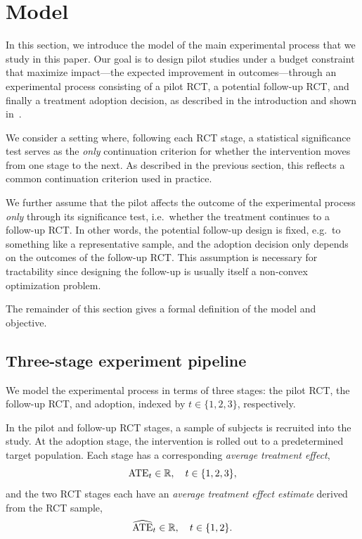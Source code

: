 \section{Model}
\label{sec:Model}

In this section, we introduce the model of the main experimental process that we study in this paper.
Our goal is to design pilot studies under a budget constraint that maximize impact---the expected improvement in outcomes---through an experimental process consisting of a pilot RCT, a potential follow-up RCT, and finally a treatment adoption decision, as described in the introduction and shown in~.

We consider a setting where, following each RCT stage, a statistical significance test serves as the \emph{only} continuation criterion for whether the intervention moves from one stage to the next.
As described in the previous section, this reflects a common continuation criterion used in practice.

We further assume that the pilot affects the outcome of the experimental process \emph{only} through its significance test, i.e.\ whether the treatment continues to a follow-up RCT.
In other words, the potential follow-up design is fixed, e.g.\ to something like a representative sample, and the adoption decision only depends on the outcomes of the follow-up RCT.
This assumption is necessary for tractability since designing the follow-up is usually itself a non-convex optimization problem.

The remainder of this section gives a formal definition of the model and objective.

\subsection{Three-stage experiment pipeline}

We model the experimental process in terms of three stages: the pilot RCT, the follow-up RCT, and adoption, indexed by $t\in\{1,2,3\}$, respectively.

In the pilot and follow-up RCT stages, a sample of subjects is recruited into the study.
At the adoption stage, the intervention is rolled out to a predetermined target population.
Each stage has a corresponding \emph{average treatment effect},
\[
  \mathrm{ATE}_t\in\mathbb{R},\quad t\in\{1,2,3\},
\]
and the two RCT stages each have an \emph{average treatment effect estimate} derived from the RCT sample,
\[
  \widehat{\mathrm{ATE}}_t\in\mathbb{R},\quad t\in\{1,2\}.
\]

